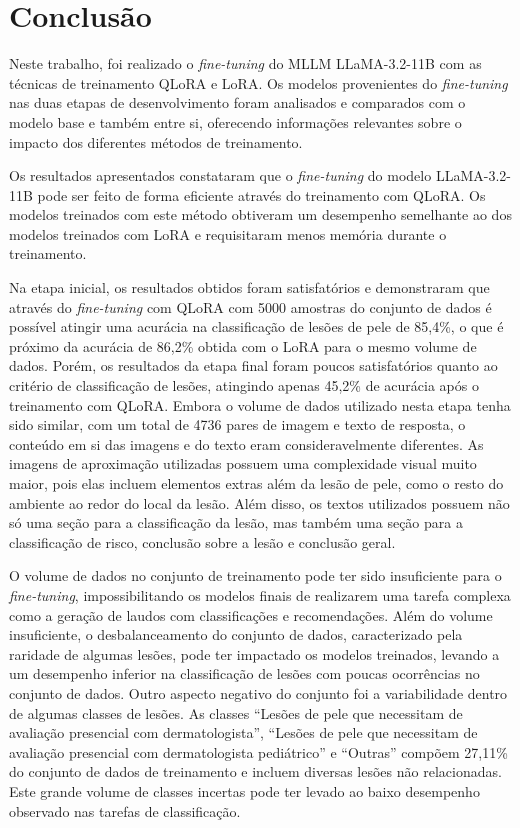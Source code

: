 \chapter{Conclusão}

Neste trabalho, foi realizado o \textit{fine-tuning} do \ac{MLLM} \ac{LLaMA}-3.2-11B com as técnicas de treinamento
\ac{QLoRA} e \ac{LoRA}. Os modelos provenientes do \textit{fine-tuning} nas duas etapas de desenvolvimento foram
analisados e comparados com o modelo base e também entre si, oferecendo informações relevantes sobre o impacto dos
diferentes métodos de treinamento.

Os resultados apresentados constataram que o \textit{fine-tuning} do modelo \ac{LLaMA}-3.2-11B pode ser feito de forma
eficiente através do treinamento com \ac{QLoRA}. Os modelos treinados com este método obtiveram um desempenho
semelhante ao dos modelos treinados com \ac{LoRA} e requisitaram menos memória durante o treinamento.

Na etapa inicial, os resultados obtidos foram satisfatórios e demonstraram que através do \textit{fine-tuning} com
\ac{QLoRA} com 5000 amostras do conjunto de dados é possível atingir uma acurácia na classificação
de lesões de pele de 85,4\%, o que é próximo da acurácia de 86,2\% obtida com o \ac{LoRA} para o mesmo volume de dados.
Porém, os resultados da etapa final foram poucos satisfatórios quanto ao critério de classificação de lesões, atingindo
apenas 45,2\% de acurácia após o treinamento com \ac{QLoRA}. Embora o volume de dados utilizado nesta etapa tenha sido
similar, com um total de 4736 pares de imagem e texto de resposta, o conteúdo em si das imagens e do texto eram
consideravelmente diferentes. As imagens de aproximação utilizadas possuem uma complexidade visual muito maior, pois
elas incluem elementos extras além da lesão de pele, como o resto do ambiente ao redor do local da lesão. Além disso,
os textos utilizados possuem não só uma seção para a classificação da lesão, mas também uma seção para a classificação
de risco, conclusão sobre a lesão e conclusão geral.

O volume de dados no conjunto de treinamento pode ter sido insuficiente para o \textit{fine-tuning}, impossibilitando
os modelos finais de realizarem uma tarefa complexa como a geração de laudos com classificações e recomendações. Além
do volume insuficiente, o desbalanceamento do conjunto de dados, caracterizado pela raridade de algumas lesões, pode
ter impactado os modelos treinados, levando a um desempenho inferior na classificação de lesões com poucas ocorrências
no conjunto de dados. Outro aspecto negativo do conjunto foi a variabilidade dentro de algumas classes de lesões. As
classes ``Lesões de pele que necessitam de avaliação presencial com dermatologista'', ``Lesões de pele que necessitam
de avaliação presencial com dermatologista pediátrico'' e ``Outras'' compõem 27,11\% do conjunto de dados de
treinamento e incluem diversas lesões não relacionadas. Este grande volume de classes incertas pode ter levado ao baixo
desempenho observado nas tarefas de classificação.

